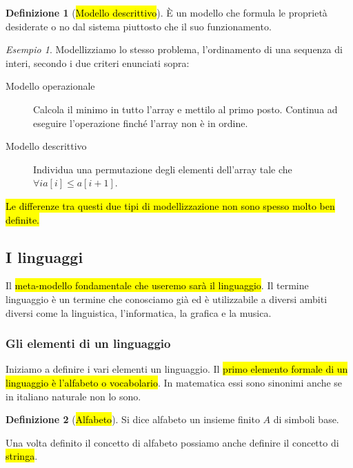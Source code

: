\documentclass[a4paper,11pt,oneside]{article}
\theoremstyle{plain}
\theoremstyle{definition}
\newtheorem{defn}{Definizione}[section]
\theoremstyle{remark}
\newtheorem*{esempio}{Esempio}
\begin{document}
\begin{defn}[\hl{Modello descrittivo}]\label{def:modello-desc}
  È un modello che formula le proprietà desiderate o no dal sistema piuttosto
  che il suo funzionamento.
\end{defn}

\begin{esempio}
  Modellizziamo lo stesso problema, l'ordinamento di una sequenza di interi,
  secondo i due criteri enunciati sopra:
  \begin{description}
    \item[Modello operazionale] Calcola il minimo in tutto l'array e mettilo al
      primo posto. Continua ad eseguire l'operazione finché l'array non è in
      ordine.
    \item[Modello descrittivo] Individua una permutazione degli elementi
      dell'array tale che \(\forall i a[i] \leq a[i+1]\).
  \end{description}
\end{esempio}

\hl{Le differenze tra questi due tipi di modellizzazione non sono spesso molto
ben definite.}

\subsection{I linguaggi}\label{sec:linguaggi}

Il \hl{meta-modello fondamentale che useremo sarà il linguaggio}. Il termine
linguaggio è un termine che conosciamo già ed è utilizzabile a diversi ambiti
diversi come la linguistica, l'informatica, la grafica e la musica.

\subsubsection{Gli elementi di un linguaggio}\label{sec:linguaggi-elementi}

Iniziamo a definire i vari elementi un linguaggio. Il \hl{primo elemento formale
di un linguaggio è l'alfabeto o vocabolario}. In matematica essi sono sinonimi
anche se in italiano naturale non lo sono.

\begin{defn}[\hl{Alfabeto}]\label{def:alfabeto}
  Si dice alfabeto un insieme finito $A$ di simboli base.
\end{defn}

Una volta definito il concetto di alfabeto possiamo anche definire il concetto
di \hl{stringa}.
\end{document}
